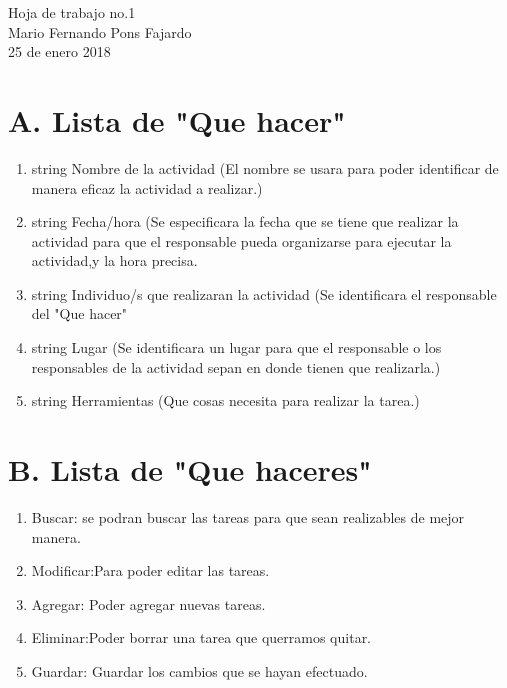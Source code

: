 \documentclass[10pt,a4paper]{article}
\begin{document}
\begin{center}
\huge {Hoja de trabajo no.1} \\
\large {Mario Fernando Pons Fajardo} \\
\large {25 de enero 2018}

\end{center}

\section*{A. Lista de "Que hacer"}

\begin{enumerate}
			\item{string Nombre de la actividad (El nombre se usara para poder identificar de manera eficaz la actividad a realizar.)}
			\item{string Fecha/hora (Se especificara la fecha que se tiene que realizar la actividad para que el responsable pueda organizarse para ejecutar la actividad,y la hora precisa.}
			\item{string Individuo/s que realizaran la actividad (Se identificara el responsable del "Que hacer" }

			\item{string Lugar (Se identificara un lugar para que el responsable o los responsables de la actividad sepan en donde tienen que realizarla.)}

			\item{string Herramientas (Que cosas necesita para realizar la tarea.)}


\end{enumerate}


\section*{B. Lista de "Que haceres"}

\begin{enumerate}
        \item{ Buscar: se podran buscar las tareas para que sean realizables de mejor manera.}
        \item{ Modificar:Para poder editar las tareas. }
        \item{ Agregar: Poder agregar nuevas tareas. }
        \item{ Eliminar:Poder borrar una tarea que querramos quitar. }
        \item{ Guardar: Guardar los cambios que se hayan efectuado.}
\end{enumerate}
\end{document}
